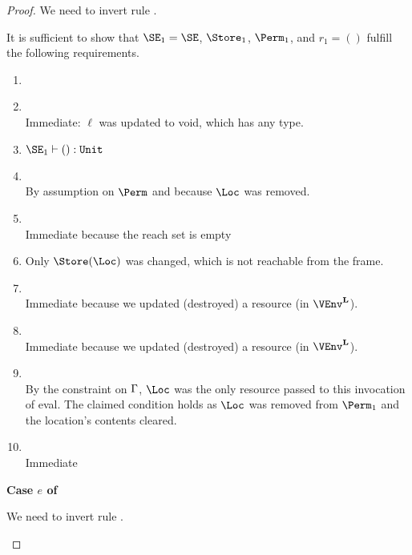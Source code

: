\begin{proof}
  We need to invert rule .
  \begin{mathpar}
  \end{mathpar}
  It is sufficient to show that $\SE_1 = \SE$,
  $\Store_1$, $\Perm_1$, and $r_1 = ()$ fulfill the following
  requirements.
  \begin{enumerate}[({R}1)]
  \item {}
  \item {} \\
    Immediate: $\ell$ was updated to void, which has any type.
  \item $\SE_1 \vdash () : \tunit$
  \item {}\\
    By assumption on $\Perm$ and because $\Loc$ was removed.
  \item {} \\
    Immediate because the reach set is empty
  \item {} 
    Only $\Store (\Loc)$ was changed, which is not reachable from the frame.
  \item {} \\
    Immediate because we updated (destroyed) a resource (in $\Active\VEnv$).
  \item {} \\
    Immediate because we updated (destroyed) a resource (in $\Active\VEnv$).
  \item {} \\
    By the constraint on $\E$, $\Loc$ was the only resource passed to
    this invocation of eval. The claimed condition holds as $\Loc$ was
    removed from $\Perm_1$ and the location's contents cleared.
  \item {}
    \\ Immediate
  \end{enumerate}

  \newpage
  \textbf{Case $e$ of}

  We need to invert rule .
  \begin{mathpar}
  \end{mathpar}


\end{proof}
